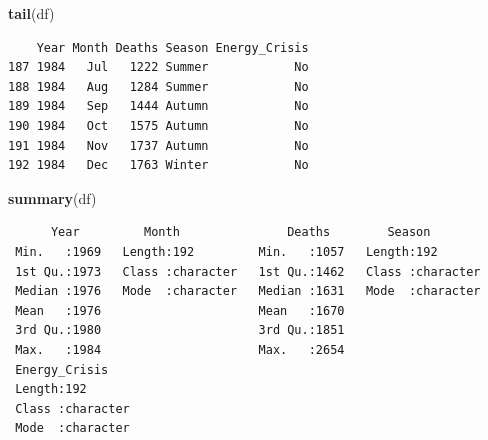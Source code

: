 \documentclass[
  10t,
]{article}
\newenvironment{Shaded}{\begin{snugshade}}{\end{snugshade}}
\newcommand{\FunctionTok}[1]{\textcolor[rgb]{0.13,0.29,0.53}{\textbf{#1}}}
\newcommand{\NormalTok}[1]{#1}
\begin{document}
\begin{Shaded}
\begin{Highlighting}[]
\FunctionTok{tail}\NormalTok{(df)}
\end{Highlighting}
\end{Shaded}

\begin{verbatim}
    Year Month Deaths Season Energy_Crisis
187 1984   Jul   1222 Summer            No
188 1984   Aug   1284 Summer            No
189 1984   Sep   1444 Autumn            No
190 1984   Oct   1575 Autumn            No
191 1984   Nov   1737 Autumn            No
192 1984   Dec   1763 Winter            No
\end{verbatim}

\begin{Shaded}
\begin{Highlighting}[]
\FunctionTok{summary}\NormalTok{(df)}
\end{Highlighting}
\end{Shaded}

\begin{verbatim}
      Year         Month               Deaths        Season         
 Min.   :1969   Length:192         Min.   :1057   Length:192        
 1st Qu.:1973   Class :character   1st Qu.:1462   Class :character  
 Median :1976   Mode  :character   Median :1631   Mode  :character  
 Mean   :1976                      Mean   :1670                     
 3rd Qu.:1980                      3rd Qu.:1851                     
 Max.   :1984                      Max.   :2654                     
 Energy_Crisis     
 Length:192        
 Class :character  
 Mode  :character  
                   
                   
                   
\end{verbatim}
\end{document}
